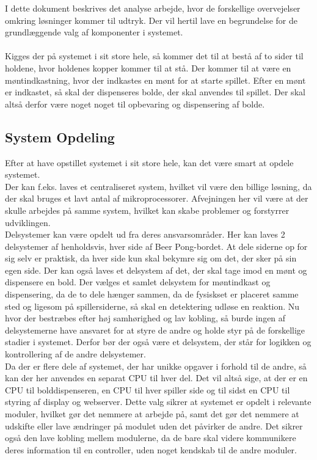 \documentclass[a4paper,12pt,fleqn,oneside]{article}
\begin{document}

\tableofcontents
\newpage
I dette dokument beskrives det analyse arbejde, hvor de forskellige overvejelser omkring løsninger kommer til udtryk. Der vil hertil lave en begrundelse for de grundlæggende valg af komponenter i systemet. \\\\
Kigges der på systemet i sit store hele, så kommer det til at bestå af to sider til holdene, hvor holdenes kopper kommer til at stå. Der kommer til at være en møntindkastning, hvor der indkastes en mønt for at starte spillet. Efter en mønt er indkastet, så skal der dispenseres bolde, der skal anvendes til spillet. Der skal altså derfor være noget noget til opbevaring og dispensering af bolde.\\ 
\subsection{System Opdeling}\label{sec:sys_opdeling}
Efter at have opstillet systemet i sit store hele, kan det være smart at opdele systemet.\\
Der kan f.eks. laves et centraliseret system, hvilket vil være den billige løsning, da der skal bruges et lavt antal af mikroprocessorer. Afvejningen her vil være at der skulle arbejdes på samme system, hvilket kan skabe problemer og forstyrrer udviklingen.\\
Delsystemer kan være opdelt ud fra deres ansvarsområder. Her kan laves 2 delsystemer af henholdsvis, hver side af Beer Pong-bordet. At dele siderne op for sig selv er praktisk, da hver side kun skal bekymre sig om det, der sker på sin egen side. Der kan også laves et delsystem af det, der skal tage imod en mønt og dispensere en bold. Der vælges et samlet delsystem for møntindkast og dispensering, da de to dele hænger sammen, da de fysiskset er placeret samme sted og ligesom på spillersiderne, så skal en detektering udløse en reaktion. Nu hvor der bestræbes efter høj samhørighed og lav kobling, så burde ingen af delsystemerne have ansvaret for at styre de andre og holde styr på de forskellige stadier i systemet. Derfor bør der også være et delsystem, der står for logikken og kontrollering af de andre delsystemer.\\
Da der er flere dele af systemet, der har unikke opgaver i forhold til de andre, så kan der her anvendes en separat CPU til hver del. Det vil altså sige, at der er en CPU til bolddispenseren, en CPU til hver spiller side og til sidst en CPU til styring af display og webserver. Dette valg sikrer at systemet er opdelt i relevante moduler, hvilket gør det nemmere at arbejde på, samt det gør det nemmere at udskifte eller lave ændringer på modulet uden det påvirker de andre. Det sikrer også den lave kobling mellem modulerne, da de bare skal videre kommunikere deres information til en controller, uden noget kendskab til de andre moduler.
\end{document}
